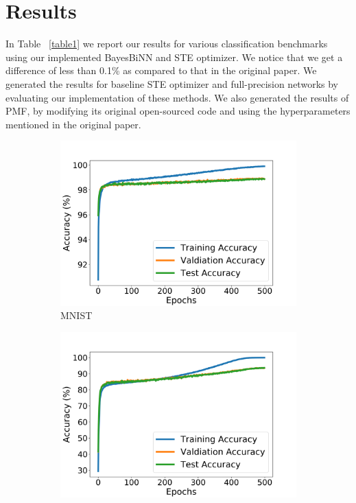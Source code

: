 \section{Results}
In Table ~\ref{table1} we report our results for various classification benchmarks using our implemented BayesBiNN and STE optimizer. We notice that we get a difference of less than 0.1\% as compared to that in the original paper. We generated the results for baseline STE optimizer and full-precision networks by evaluating our implementation of these methods. We also generated the results of PMF, by modifying its original open-sourced code and using the hyperparameters mentioned in the original paper.

\begin{figure}[h]
     \centering
     \begin{subfigure}[b]{0.3\textwidth}
         \centering
         \includegraphics[width=1.2\textwidth]{../openreview/figs/MNIST.png}
         \caption{MNIST}
         \label{fig:y equals x}
     \end{subfigure}
     \hfill
     \begin{subfigure}[b]{0.3\textwidth}
         \centering
         \includegraphics[width=1.2\textwidth]{../openreview/figs/CIFAR10.png}

\end{subfigure}
\end{figure}
